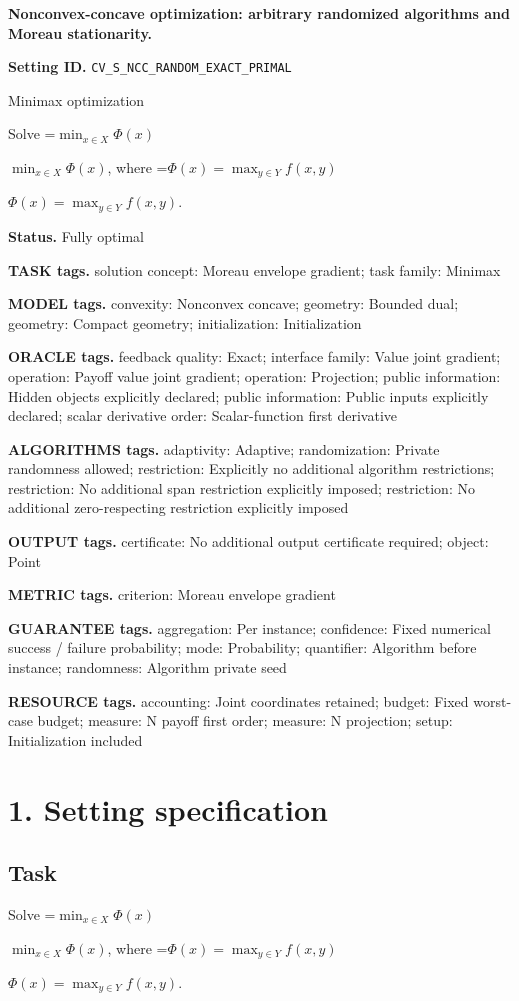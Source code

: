 \documentclass[10pt,a4paper]{article}
\newcommand{\AtlasMath}[1]{\par\begingroup\centering\setbox0=\hbox{$\displaystyle #1$}\ifdim\wd0>1.4\linewidth\typeout{ATLAS WIDE FORMULA: \the\wd0}\fi\ifdim\wd0>\linewidth\resizebox{\linewidth}{!}{\box0}\else\box0\fi\par\endgroup}
\newcommand{\AtlasInlineMath}[1]{\begingroup\setbox0=\hbox{$#1$}\ifdim\wd0>.4\linewidth\endgroup\AtlasMath{#1}\else\endgroup$#1$\fi}
\begin{document}
\raggedright

{\LARGE\bfseries\sffamily\color{AtlasNavy} Nonconvex-concave optimization: arbitrary randomized algorithms and Moreau stationarity.\par}\vspace{5pt}
\textbf{Setting ID.} \texttt{CV\_\allowbreak{}S\_\allowbreak{}NCC\_\allowbreak{}RANDOM\_\allowbreak{}EXACT\_\allowbreak{}PRIMAL}

Minimax optimization

Solve \AtlasInlineMath{\min_{x\in X}\Phi(x)}, where \AtlasInlineMath{\Phi(x)=\max_{y\in Y}f(x,y)}.

\textbf{Status.} Fully optimal

\textbf{TASK tags.} solution concept: Moreau envelope gradient; task family: Minimax

\textbf{MODEL tags.} convexity: Nonconvex concave; geometry: Bounded dual; geometry: Compact geometry; initialization: Initialization

\textbf{ORACLE tags.} feedback quality: Exact; interface family: Value joint gradient; operation: Payoff value joint gradient; operation: Projection; public information: Hidden objects explicitly declared; public information: Public inputs explicitly declared; scalar derivative order: Scalar-function first derivative

\textbf{ALGORITHMS tags.} adaptivity: Adaptive; randomization: Private randomness allowed; restriction: Explicitly no additional algorithm restrictions; restriction: No additional span restriction explicitly imposed; restriction: No additional zero-respecting restriction explicitly imposed

\textbf{OUTPUT tags.} certificate: No additional output certificate required; object: Point

\textbf{METRIC tags.} criterion: Moreau envelope gradient

\textbf{GUARANTEE tags.} aggregation: Per instance; confidence: Fixed numerical success / failure probability; mode: Probability; quantifier: Algorithm before instance; randomness: Algorithm private seed

\textbf{RESOURCE tags.} accounting: Joint coordinates retained; budget: Fixed worst-case budget; measure: N payoff first order; measure: N projection; setup: Initialization included

\section{1. Setting specification}
\subsection{Task}
Solve \AtlasInlineMath{\min_{x\in X}\Phi(x)}, where \AtlasInlineMath{\Phi(x)=\max_{y\in Y}f(x,y)}.
\end{document}
